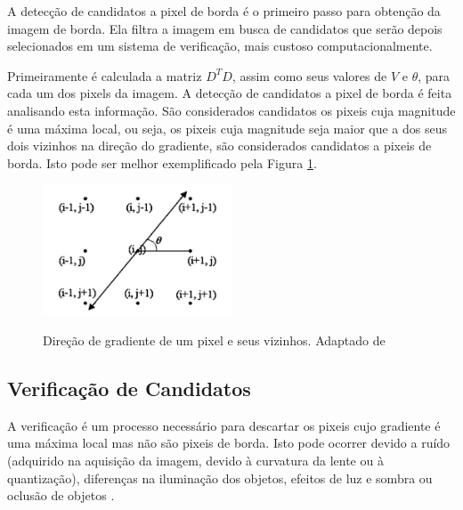 A detecção de candidatos a pixel de borda é o primeiro passo para obtenção da imagem de borda. Ela filtra a imagem em busca de candidatos que serão depois selecionados em um sistema de verificação, mais custoso computacionalmente.

Primeiramente é calculada a matriz $D^TD$, assim como seus valores de $V$ e $\theta$, para cada um dos pixels da imagem. A detecção de candidatos a pixel de borda é feita analisando esta informação. São considerados candidatos os pixeis cuja magnitude é uma máxima local, ou seja, os pixeis cuja magnitude seja maior que a dos seus dois vizinhos na direção do gradiente, são considerados candidatos a pixeis de borda. Isto pode ser melhor exemplificado pela Figura \ref{maxlocal}.


\begin{figure} [h]
\centering
\includegraphics[width = 0.5\textwidth]{figuras/vizinh.jpg} \label{maxlocal}
\caption{Direção de gradiente de um pixel e seus vizinhos. Adaptado de \cite{mrf}}
\end{figure}

\subsection{Verificação de Candidatos}

A verificação é um processo necessário para descartar os pixeis cujo gradiente é uma máxima local mas não são pixeis de borda. Isto pode ocorrer devido a ruído (adquirido na aquisição da imagem, devido à curvatura da lente ou à quantização), diferenças na iluminação dos objetos, efeitos de luz e sombra ou oclusão de objetos \cite{ruidocausas}.


